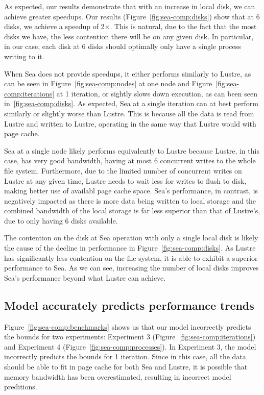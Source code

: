       As expected, our results demonstrate that with an increase in local disk,
      we can achieve greater speedups. Our results
      (Figure~\ref{fig:sea-comp:disks}) show that at 6 disks, we achieve a
      speedup of 2$\times$. This is natural, due to the fact that the most disks
      we have, the less contention there will be on any given disk. In
      particular, in our case, each disk at 6 disks should optimally only have a
      single process writing to it.

      When Sea does not provide speedups, it either performs similarly to
      Lustre, as can be seen in Figure~\ref{fig:sea-comp:nodes} at one node and
      Figure~\ref{fig:sea-comp:iterations} at 1 iteration, or sightly slows down
      execution, as can been seen in~\ref{fig:sea-comp:disks}. As expected,
      Sea at a single iteration can at best perform similarly or slightly worse than
      Lustre. This is because all the data is read from Lustre and written to
      Lustre, operating in the same way that Lustre would with page cache.

      Sea at a single node likely performs equivalently to Lustre because
      Lustre, in this case, has very good bandwidth, having at most 6 concurrent
      writes to the whole file system. Furthermore, due to the limited number of
      concurrent writes on Lustre at any given time, Lustre needs to wait less
      for writes to flush to disk, making better use of availabl page cache
      space. Sea's performance, in contrast, is negatively impacted as there is
      more data being written to local storage and the combined bandwidth of the
      local storage is far less superior than that of Lustre's, due to only
      having 6 disks available.

      The contention on the disk at Sea operation with only a single local disk
      is likely the cause of the decline in performance in
      Figure~\ref{fig:sea-comp:disks}. As Lustre has significantly less
      contention on the file system, it is able to exhibit a superior
      performance to Sea. As we can see, increasing the number of local disks
      improves Sea's performance beyond what Lustre can achieve.
    

      \subsection{Model accurately predicts performance trends}

      Figure~\ref{fig:sea-comp:benchmarks} shows us that our model incorrectly predicts
      the bounds for two experiments: Experiment 3 (Figure~\ref{fig:sea-comp:iterations})
      and Experiment 4 (Figure~\ref{fig:sea-comp:processes}). In Experiment 3, the model incorrectly
      predicts the bounds for 1 iteration. Since in this case, all the data should be able to fit
      in page cache for both Sea and Lustre, it is possible that memory bandwidth has been
      overestimated, resulting in incorrect model preditions.

